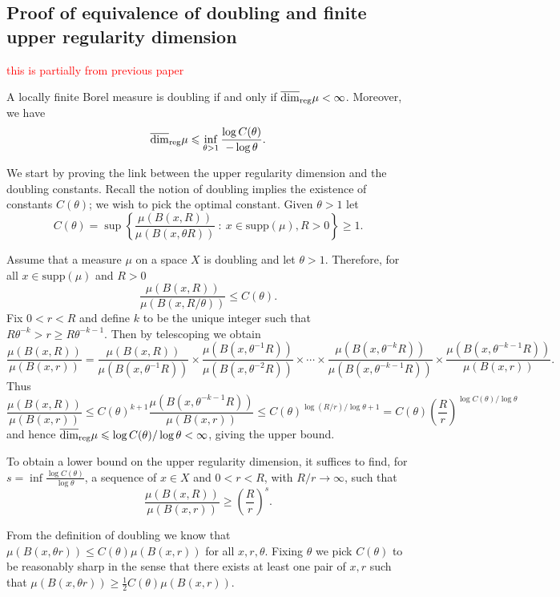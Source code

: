 \subsection{Proof of equivalence of doubling and finite upper regularity dimension} \label{ch-upper-reg:doublingproof}
\textcolor{red}{this is partially from previous paper}


	A locally finite Borel measure is doubling if and only if $\overline{\dim}_{\textup{reg}} \mu<\infty$.  Moreover, we have
	\[
	\overline{\dim}_{\textup{reg}} \mu \leqslant \inf_{\theta > 1} \frac{ \log C(\theta)}{ - \log \theta}.
	\]

We start by proving the link between the upper regularity dimension and the doubling constants. Recall the notion of doubling implies the existence of constants $C(\theta)$; we wish to pick the optimal constant. Given $\theta > 1$ let
\[
C(\theta) = \sup \left\{ \frac{\mu(B(x,R))}{\mu(B(x,\theta R))} \ : \ x \in \text{supp}(\mu), R>0 \right\} \geq 1.
\]

Assume that a measure $\mu$ on a space $X$ is doubling and let $\theta > 1$.  Therefore, for all $x \in \text{supp}(\mu)$ and $R>0$
\[
\frac{\mu(B(x,R))}{\mu(B(x,R/\theta))} \le C(\theta).
\]
Fix  $0< r < R$ and  define $k$ to be the unique integer such that $R\theta^{-k} > r \ge R\theta^{-k-1}$. Then by telescoping we obtain
\[
\frac{\mu(B(x,R))}{\mu(B(x,r))} = \frac{\mu(B(x,R))}{\mu(B(x,\theta^{-1} R))} \times \frac{\mu(B(x,\theta^{-1} R))}{\mu(B(x,\theta^{-2} R))} \times\cdots \times \frac{\mu(B(x,\theta^{-k} R))}{\mu(B(x,\theta^{-k-1}R))} \times \frac{\mu(B(x,\theta^{-k-1}R))}{\mu(B(x,r))}.
\]
Thus 
\[
\frac{\mu(B(x,R))}{\mu(B(x,r))} \le C(\theta)^{k+1}  \frac{\mu(B(x,\theta^{-k-1}R))}{\mu(B(x,r))} \le C(\theta)^{\log(R/r) / \log \theta+1} = C(\theta) \left(\frac{R}{r} \right)^{\log C(\theta) / \log \theta}
\]
and hence $\overline{\dim}_{\textup{reg}} \mu \leqslant \log C(\theta) / \log \theta < \infty$, giving the upper bound.


To obtain a lower bound on the upper regularity dimension, it suffices to find, for $s = \inf\frac{\log C(\theta)}{\log \theta}$, a sequence of $x\in X$ and $0<r<R$, with $R/r \rightarrow \infty$, such that 
\[
\frac{\mu(B(x,R))}{\mu(B(x,r))} \ge \left(\frac{R}{r}\right)^s.
\]
	
	
From the definition of doubling we know that $\mu(B(x,\theta r) ) \le C(\theta) \mu(B(x,r))$ for all $x,r, \theta$. Fixing $\theta$ we pick $C(\theta)$ to be reasonably sharp in the sense that there exists at least one pair of $x,r$ such that $\mu(B(x,\theta r) ) \ge \frac{1}{2}C(\theta) \mu(B(x,r))$. 
	
